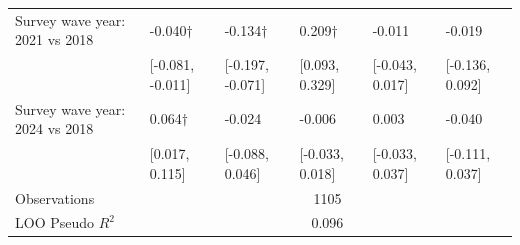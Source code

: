 \begin{tabular}[t]{llllll}
Survey wave year: 2021 vs 2018 & -0.040$\dagger$ & -0.134$\dagger$ & 0.209$\dagger$ & -0.011 & -0.019\\
 & {}[-0.081, -0.011] & {}[-0.197, -0.071] & {}[0.093, 0.329] & {}[-0.043, 0.017] & {}[-0.136, 0.092]\\
Survey wave year: 2024 vs 2018 & 0.064$\dagger$ & -0.024 & -0.006 & 0.003 & -0.040\\
 & {}[0.017, 0.115] & {}[-0.088, 0.046] & {}[-0.033, 0.018] & {}[-0.033, 0.037] & {}[-0.111, 0.037]\\
\midrule
Observations & \multicolumn{5}{c}{1105} &  &  &  & \\
LOO Pseudo $R^2$ & \multicolumn{5}{c}{0.096} &  &  &  & \\
\bottomrule
\end{tabular}